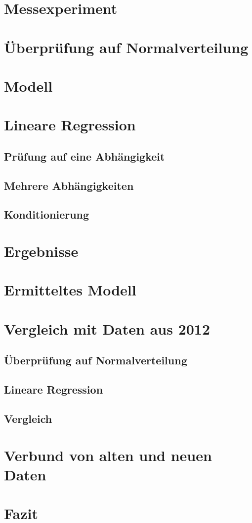 \section{Messexperiment}
\section{Überprüfung auf Normalverteilung}
\section{Modell}
\section{Lineare Regression}
\subsection{Prüfung auf eine Abhängigkeit}
\subsection{Mehrere Abhängigkeiten}
\subsection{Konditionierung}

\section{Ergebnisse}
\section{Ermitteltes Modell}

\section{Vergleich mit Daten aus 2012}
\subsection{Überprüfung auf Normalverteilung}
\subsection{Lineare Regression}
\subsection{Vergleich}

\section{Verbund von alten und neuen Daten}

\section{Fazit}

